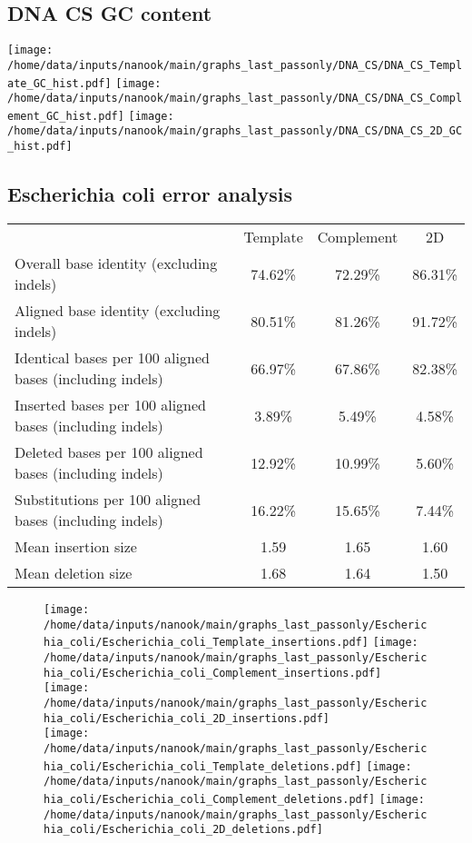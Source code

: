\documentclass[a4paper,11pt,oneside]{article}
\begin{document}
\subsection*{DNA CS GC content}
\texttt{[image: /home/data/inputs/nanook/main/graphs\_last\_passonly/DNA\_CS/DNA\_CS\_Template\_GC\_hist.pdf]}
\texttt{[image: /home/data/inputs/nanook/main/graphs\_last\_passonly/DNA\_CS/DNA\_CS\_Complement\_GC\_hist.pdf]}
\texttt{[image: /home/data/inputs/nanook/main/graphs\_last\_passonly/DNA\_CS/DNA\_CS\_2D\_GC\_hist.pdf]}
\clearpage
\subsection*{Escherichia coli error analysis}
\vspace{-3mm}
\begin{table}[H]
{\footnotesize
\fontsize{9pt}{11pt}\selectfont
\begin{tabular}{l c c c}
 & Template & Complement & 2D \\
Overall base identity (excluding indels) & 74.62\% & 72.29\% & 86.31\% \\
Aligned base identity (excluding indels) & 80.51\% & 81.26\% & 91.72\% \\
Identical bases per 100 aligned bases (including indels) & 66.97\% & 67.86\% & 82.38\% \\
Inserted bases per 100 aligned bases (including indels) & 3.89\% & 5.49\% & 4.58\% \\
Deleted bases per 100 aligned bases (including indels) & 12.92\% & 10.99\% & 5.60\% \\
Substitutions per 100 aligned bases (including indels) & 16.22\% & 15.65\% & 7.44\% \\
Mean insertion size & 1.59 & 1.65 & 1.60 \\
Mean deletion size & 1.68 & 1.64 & 1.50 \\
\end{tabular}
}
\end{table}
\vspace{-5mm}
\begin{figure}[H]
\centering
\texttt{[image: /home/data/inputs/nanook/main/graphs\_last\_passonly/Escherichia\_coli/Escherichia\_coli\_Template\_insertions.pdf]}
\texttt{[image: /home/data/inputs/nanook/main/graphs\_last\_passonly/Escherichia\_coli/Escherichia\_coli\_Complement\_insertions.pdf]}
\texttt{[image: /home/data/inputs/nanook/main/graphs\_last\_passonly/Escherichia\_coli/Escherichia\_coli\_2D\_insertions.pdf]} \\
\texttt{[image: /home/data/inputs/nanook/main/graphs\_last\_passonly/Escherichia\_coli/Escherichia\_coli\_Template\_deletions.pdf]}
\texttt{[image: /home/data/inputs/nanook/main/graphs\_last\_passonly/Escherichia\_coli/Escherichia\_coli\_Complement\_deletions.pdf]}
\texttt{[image: /home/data/inputs/nanook/main/graphs\_last\_passonly/Escherichia\_coli/Escherichia\_coli\_2D\_deletions.pdf]}
\end{figure}
\end{document}
